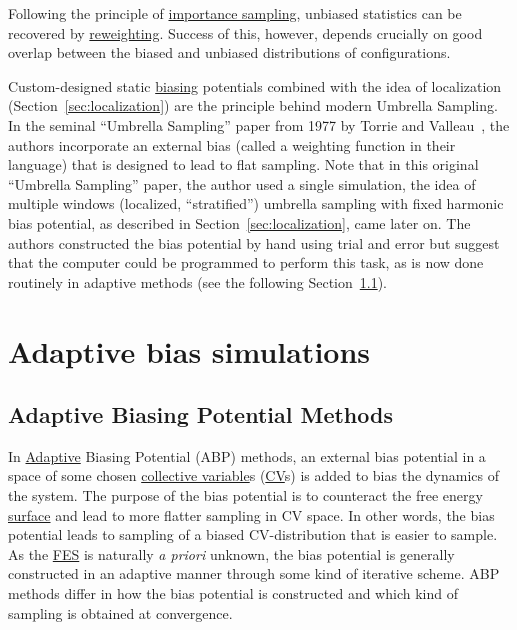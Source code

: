 \documentclass[9pt,review]{livecoms}
\begin{document}
Following the principle of \hyperlink{ref:IS} {importance sampling}, unbiased statistics can be recovered by \hyperlink{ref:Reweighting} {reweighting}.
Success of this, however, depends crucially on good overlap between the biased and unbiased distributions of configurations.

Custom-designed static \hyperlink{ref:biasingE} {biasing} potentials combined with the idea of localization (Section~\ref{sec:localization}) are the principle behind modern Umbrella Sampling.
In the seminal ``Umbrella Sampling'' paper from 1977 by Torrie and Valleau~\cite{TORRIE1977187}, the authors incorporate an external bias (called a weighting function in their language) that is designed to lead to flat sampling. Note that in this original ``Umbrella Sampling'' paper, the author used a single simulation, the idea of multiple windows (localized, ``stratified'') umbrella sampling with fixed harmonic bias potential, as described in Section~\ref{sec:localization}, came later on. The authors constructed the bias potential by hand using trial and error but suggest that the computer could be programmed to perform this task, as is now done routinely in adaptive methods (see the following Section~\ref{sec:ABP}).


\section{Adaptive bias simulations}
\label{sec:AdaptiveBiasSimulations}

\subsection{Adaptive Biasing Potential Methods}
\label{sec:ABP}
In \hyperlink{ref:Adaptive} {Adaptive} Biasing Potential (ABP) methods, an external bias potential in a space of some chosen \hyperlink{ref:CV} {collective variable}s (\hyperlink{ref:CV} {CV}s) is added to bias the dynamics of the system. The purpose of the bias potential is to counteract the free energy \hyperlink{ref:FES} {surface} and lead to more flatter sampling in CV space. In other words, the bias potential leads to sampling of a biased CV-distribution that is easier to sample. As the \hyperlink{ref:FES} {FES} is naturally \textit{a priori} unknown, the bias potential is generally constructed in an adaptive manner through some kind of iterative scheme. ABP methods  differ in how the bias potential is constructed and which kind of sampling is obtained at convergence.
\end{document}
